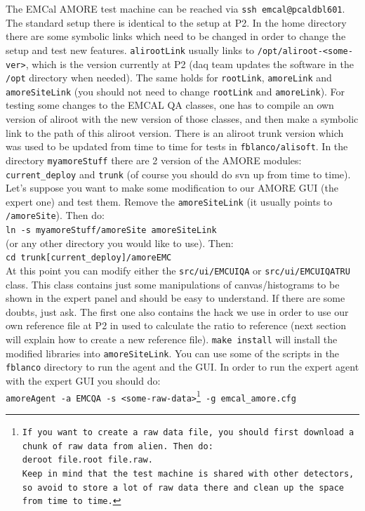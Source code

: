 The EMCal AMORE test machine can be reached via \texttt{ssh
  emcal@pcaldbl601}. The standard setup there is identical to the
setup at P2. In the home directory there are some symbolic links which
need to be changed in order to change the setup and test new
features. \texttt{alirootLink} usually links to
\texttt{/opt/aliroot-<some-ver>}, which is the version currently at P2
(daq team updates the software in the \texttt{/opt} directory when
needed). The same holds for \texttt{rootLink}, \texttt{amoreLink} and
\texttt{amoreSiteLink} (you should not need to change
\texttt{rootLink} and \texttt{amoreLink}). For testing some changes to
the EMCAL QA classes, one has to compile an own version of aliroot
with the new version of those classes, and then make a symbolic link
to the path of this aliroot version. There is an aliroot trunk version
which was used to be updated from time to time for tests in \texttt{fblanco/alisoft}. In the directory \texttt{myamoreStuff} there are 2 version of the AMORE modules: \texttt{current\_deploy} and \texttt{trunk} (of course you should do svn up from time to time). Let's suppose you want to make some modification to our AMORE GUI (the expert one) and test them. Remove the \texttt{amoreSiteLink} (it usually points to \texttt{/amoreSite}). Then do:\\
\texttt{ln -s myamoreStuff/amoreSite amoreSiteLink}\\
(or any other directory you would like to use). Then:\\
\texttt{cd trunk[current\_deploy]/amoreEMC}\\
At this point you can modify either the \texttt{src/ui/EMCUIQA} or \texttt{src/ui/EMCUIQATRU} class. This class contains just some manipulations of canvas/histograms to be shown in the expert panel and should be easy to understand. If there are some doubts, just ask. The first one also contains the hack we use in order to use our own reference file at P2 in used to calculate the ratio to reference (next section will explain how to create a new reference file). \texttt{make install} will install the modified libraries into \texttt{amoreSiteLink}. You can use some of the scripts in the \texttt{fblanco} directory to run the agent and the GUI.
In order to run the expert agent with the expert GUI you should do:\\
\texttt{amoreAgent -a EMCQA -s <some-raw-data>\footnote{If you want to create a raw data file, you should first download a chunk of raw data from alien. Then do:\\ \texttt{deroot file.root file.raw}.\\ Keep in mind that the test machine is shared with other detectors, so avoid to store a lot of raw data there and clean up the space from time to time.} -g emcal\_amore.cfg}\\
